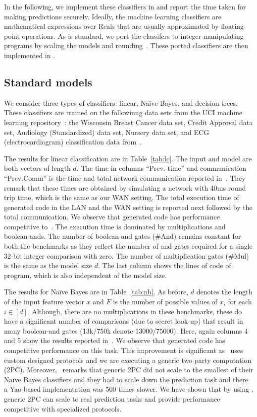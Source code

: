 In the following, we implement these classifiers in \tool and report the time taken for making predictions securely. Ideally, the machine learning classifiers are mathematical expressions over Reals that are usually approximated by floating-point operations.
As is standard, we port the classifers to integer manipulating programs by scaling the models and rounding~\cite{minionn}. These ported classifiers are then implemented in \tool.

\subsection{Standard models}
\label{sec:shallow}
We consider three types of classifiers: linear, Na\"{i}ve Bayes, and decision trees. 
These classifiers are trained on the followinng data sets from the UCI  machine learning repository~\cite{uci}:
 the Wisconsin Breast Cancer data set, 
Credit Approval data set, Audiology (Standardized) data set, Nursery data set, and
ECG (electrocardiogram) classification data from~\cite{barni}.

The results for linear classification are in Table~\ref{tab:lc}. The input and model are both vectors of length $d$. The time in columns ``Prev. time'' and communication ``Prev.Comm'' is the time and total network communication reported in~\cite{shafindss}. They remark that these times are obtained by simulating a network with 40ms round trip time, which is the same as our WAN setting. The total execution time of \tool generated code in the LAN and the WAN setting is reported next followed by the total communication.
We observe that \tool generated code has performance competitive to~\cite{shafindss}.
The execution time is dominated by multiplications and boolean-ands.
The number of boolean-and gates (\#And) remains constant for both the benchmarks as they reflect the number of and gates required for a single 32-bit integer comparison with zero. The number of multiplication gates (\#Mul) is the same as the model size $d$. The last column shows the lines of code of \tool program, which is also independent of the model size.

The results for Na\"{i}ve Bayes are in Table~\ref{tab:nb}. As before, $d$ denotes the length of the input feature vector $x$ and $F$ is the number of possible values of $x_i$ for each $i \in [d]$.
Although, there are no multiplications in these benchmarks, these do have a significant number of comparisons (due to secret look-up) that result in many boolean-and gates (13k/750k denote 13000/75000). 
Here, again columns 4 and 5 show the results reported in~\cite{shafindss}. We observe that \tool generated code has competitive performance on this task. This improvement is significant as~\cite{shafindss} uses custom designed protocols and we are executing a generic two party computation (2PC). Moreover,~\cite{shafindss} remarks that generic 2PC did not scale to the smallest of their Na\"{i}ve Bayes classifiers and they had to scale down the prediction task and there a Yao-based implementation was 500 times slower. We have shown that by using \tool, generic 2PC can scale to real prediction tasks and provide performance competitive with specialized protocols. 

